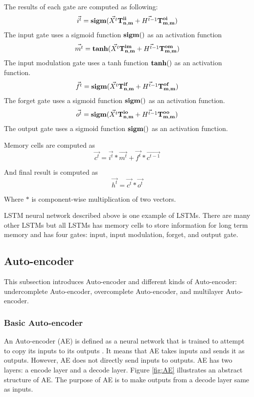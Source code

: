 \documentclass[draft,dvipsnames]{drexel-thesis}
\begin{document}
\begin{thesis}
\begin{enumerate}
	The results of each gate are computed as following:
	$$\vec{i^t} = \bold{sigm}(\vec{X^t}\bold{T_{n,m}^{ii}} + \vec{H^{t-1}}\bold{T_{m,m}^{oi}})$$
	The input gate uses a sigmoid function $\bold{sigm()}$ as an activation function
	$$\vec{m^t} = \bold{tanh}(\vec{X^t}\bold{T_{n,m}^{im}} + \vec{H^{t-1}}\bold{T_{m,m}^{om}})$$
	The input modulation gate uses a tanh function $\bold{tanh()}$ as an activation function.
	$$\vec{f^t} = \bold{sigm}(\vec{X^t}\bold{T_{n,m}^{if}} + \vec{H^{t-1}}\bold{T_{m,m}^{of}})$$
	The forget gate uses a sigmoid function $\bold{sigm()}$ as an activation function.
	$$\vec{o^t} = \bold{sigm}(\vec{X^t}\bold{T_{n,m}^{io}} + \vec{H^{t-1}}\bold{T_{m,m}^{oo}})$$
	The output gate uses a sigmoid function $\bold{sigm()}$ as an activation function.

	Memory cells are computed as
	$$\vec{c^t} = \vec{i^t} * \vec{m^t} + \vec{f^t} * \vec{c^{t-1}}$$

	And final result is computed as
	$$\vec{h^t} = \vec{c^t} * \vec{o^t}$$

	Where $*$ is component-wise multiplication of two vectors.
\end{enumerate}

	LSTM neural network described above is one example of LSTMs. There are many other LSTMs but all LSTMs has memory cells to store information for long term memory and has four gates: input, input modulation, forget, and output gate.



\subsection{Auto-encoder}\label{subsec:AE}

This subsection introduces Auto-encoder and different kinds of Auto-encoder: undercomplete Auto-encoder, overcomplete Auto-encoder, and multilayer Auto-encoder.


\subsubsection{Basic Auto-encoder}\label{subsubsec:BAE}
An Auto-encoder (AE) is defined as a neural network that is trained to attempt to copy its inputs to its outputs \cite{Goodfellow-et-al-2016}. It means that AE takes inputs and sends it as outputs. However, AE does not directly send inputs to outputs. AE has two layers: a encode layer and a decode layer. Figure \ref{fig:AE} illustrates an abstract structure of AE. The purpose of AE is to make outputs from a decode layer same as inputs.


\end{thesis}
\end{document}
